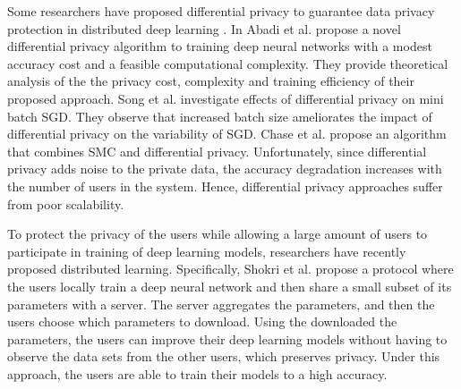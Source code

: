 \documentclass[conference]{IEEEtran}
\begin{document}

Some researchers have proposed differential privacy to guarantee data privacy protection in distributed deep learning \cite{vepakomma2018no}. In 
Abadi et al. \cite{abadi2016deep} propose a novel differential privacy algorithm to training deep neural networks with a modest
accuracy cost and a feasible computational complexity. They provide theoretical analysis of the the privacy cost, complexity and
training efficiency of their proposed approach. 
Song et al. \cite{song2013stochastic} investigate effects of differential privacy on mini batch SGD. They observe that increased batch
size ameliorates the impact of differential privacy on the variability of SGD. 
Chase et al. \cite{chase2017private} propose an algorithm that combines  SMC and differential privacy. 
Unfortunately, since differential privacy adds noise to the private data, the accuracy degradation increases with the number of users
in the system. Hence, differential privacy approaches suffer from poor scalability. 

To protect the privacy of the users while allowing a large amount of users to participate in training of deep learning
models, researchers have recently proposed distributed learning. Specifically, Shokri et al. \cite{shokri2015privacy} propose 
a protocol where the users locally train a deep neural network and then share a small subset of its parameters
with a server. The server aggregates the parameters, and then the users choose which parameters to download. 
Using the downloaded the parameters, the users can improve their deep learning models without having to observe the data sets from the
other users, which preserves privacy. Under this approach, the users are able to train their models to a high accuracy. 
\end{document}
